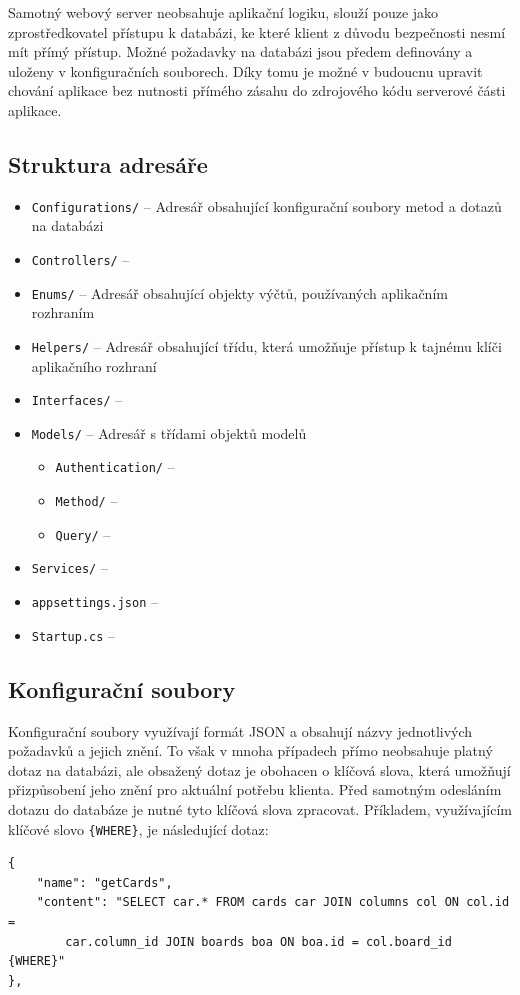 Samotný webový server neobsahuje aplikační logiku, slouží pouze jako zprostředkovatel přístupu k databázi, ke které klient z důvodu bezpečnosti nesmí mít přímý přístup. Možné požadavky na databázi jsou předem definovány a uloženy v konfiguračních souborech. Díky tomu je možné v budoucnu upravit chování aplikace bez nutnosti přímého zásahu do zdrojového kódu serverové části aplikace. 


\subsection{Struktura adresáře}
\blindtext

\begin{itemize}
  \item \texttt{Configurations/} -- Adresář obsahující konfigurační soubory metod a dotazů na databázi
  \item \texttt{Controllers/} -- 
  \item \texttt{Enums/} -- Adresář obsahující objekty výčtů, používaných aplikačním rozhraním
  \item \texttt{Helpers/} -- Adresář obsahující třídu, která umožňuje přístup k tajnému klíči aplikačního rozhraní
  \item \texttt{Interfaces/} -- %
  \item \texttt{Models/} -- Adresář s třídami objektů modelů
  \begin{itemize}
    \item \texttt{Authentication/} -- 
    \item \texttt{Method/} -- 
    \item \texttt{Query/} -- 
  \end{itemize}
  \item \texttt{Services/} -- 
  \item \texttt{appsettings.json} -- 
  \item \texttt{Startup.cs} -- 
\end{itemize}


\subsection{Konfigurační soubory}
Konfigurační soubory využívají formát JSON a obsahují názvy jednotlivých požadavků a jejich znění. To však v mnoha případech přímo neobsahuje platný dotaz na databázi, ale obsažený dotaz je obohacen o klíčová slova, která umožňují přizpůsobení jeho znění pro aktuální potřebu klienta. Před samotným odesláním dotazu do databáze je nutné tyto klíčová slova zpracovat. Příkladem, využívajícím klíčové slovo \texttt{\{WHERE\}}, je následující dotaz:
\begin{verbatim}
{
    "name": "getCards",
    "content": "SELECT car.* FROM cards car JOIN columns col ON col.id = 
        car.column_id JOIN boards boa ON boa.id = col.board_id {WHERE}"
},
\end{verbatim}


